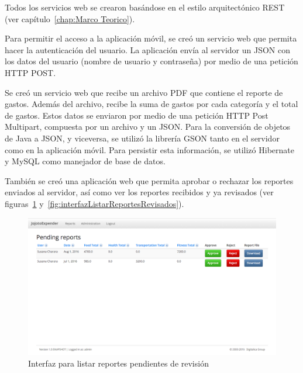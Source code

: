 Todos los servicios web se crearon basándose en el estilo arquitectónico REST (ver capítulo~\ref{chap:Marco Teorico}). 

Para permitir el acceso a la aplicación móvil, se creó un servicio web que permita hacer la autenticación del usuario. La aplicación envía al servidor un JSON con los datos del usuario (nombre de usuario y contraseña) por medio de una petición HTTP POST.

Se creó un servicio web que recibe un archivo PDF que contiene el reporte de gastos. Además del archivo, recibe la suma de gastos por cada categoría y el total de gastos. Estos datos se enviaron por medio de una petición HTTP Post Multipart, compuesta por un archivo y un JSON. Para la conversión de objetos de Java a JSON, y viceversa, se utilizó la librería GSON tanto en el servidor como en la aplicación móvil. Para persistir esta información, se utilizó Hibernate y MySQL como manejador de base de datos.

También se creó una aplicación web que permita aprobar o rechazar los reportes enviados al servidor, así como ver los reportes recibidos y ya revisados (ver figuras~\ref{fig:interfazListarReportesPendientes} y~\ref{fig:interfazListarReportesRevisados}). 

\begin{figure}[ht]
  \centering
  \includegraphics[scale=0.38,type=png,ext=.png,read=.png]{imagenes/pending_reports}
  \captionsetup{justification=centering}
  \caption{Interfaz para listar reportes pendientes de revisión}
  \label{fig:interfazListarReportesPendientes}
\end{figure}

